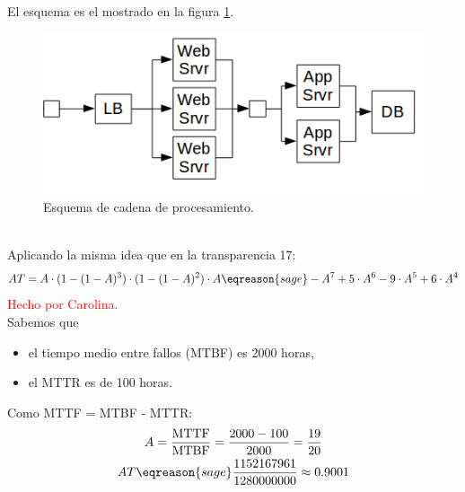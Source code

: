 \begin{problem}[7]
\spart
El esquema es el mostrado en la figura \ref{tema3:prob7:esquema}.
\begin{figure}[hbtp]
	\centering
	\includegraphics[keepaspectratio=true,width=\linewidth]{img/tema3_ej7.png}
	\caption{Esquema de cadena de procesamiento.}
	\label{tema3:prob7:esquema}
\end{figure}
$ $\\
\spart
Aplicando la misma idea que en la transparencia 17:
\[ AT = A \cdot (1 - (1 - A)^3) \cdot (1 - (1 - A)^2) \cdot A \eqreason{sage} -A^7 + 5\cdot A^6 - 9\cdot A^5 + 6\cdot A^4 \]
\spart
\textcolor{red}{Hecho por Carolina.}\\
Sabemos que
\begin{itemize}
	\item el tiempo medio entre fallos (MTBF) es 2000 horas,
	\item el MTTR es de 100 horas.
\end{itemize}
Como MTTF = MTBF - MTTR:\\
\begin{gather*}
A = \frac{\text{MTTF}}{\text{MTBF}} = \frac{2000-100}{2000} = \frac{19}{20}\\
AT \eqreason{sage} \frac{1152167961}{1280000000} \approx 0.9001
\end{gather*}
\end{problem}


